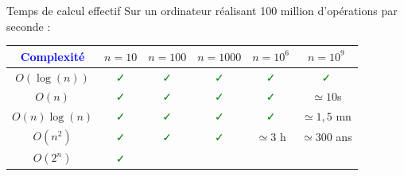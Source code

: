 \documentclass[10pt]{beamer}
\begin{document}
\begin{frame}[fragile]{\Ctitle}{\stitle}
	\begin{block}{Temps de calcul effectif}
		Sur un ordinateur réalisant 100 million d'opérations par seconde :
		\renewcommand{\arraystretch}{1.3}
		\begin{tabular}{|c|c|c|c|c|c|}
			\hline
			\textcolor{blue}{Complexité} & $n=10$                      & $n=100$                     & $n=1000$                    & $n=10^6$                    & $n=10^9$                      \\
			\hline
			$O(\log(n))$   & \textcolor{green}{\faCheck} & \textcolor{green}{\faCheck} & \textcolor{green}{\faCheck} & \textcolor{green}{\faCheck} & \textcolor{green}{\faCheck} \\
			\hline
			$O(n)$   & \textcolor{green}{\faCheck} & \textcolor{green}{\faCheck} & \textcolor{green}{\faCheck} & \textcolor{green}{\faCheck} & $\simeq 10$s \\
			\hline
			$O(n)\log(n)$   & \textcolor{green}{\faCheck} & \textcolor{green}{\faCheck} & \textcolor{green}{\faCheck} & \textcolor{green}{\faCheck} & $\simeq 1,5$ mn \\
			\hline
			$O(n^2)$   & \textcolor{green}{\faCheck} & \textcolor{green}{\faCheck} & \textcolor{green}{\faCheck} & $\simeq 3$ h & $\simeq 300$ ans \\
			\hline
			$O(2^n)$   & \textcolor{green}{\faCheck} &  \textcolor{red}{\faTimes} &  \textcolor{red}{\faTimes} &  \textcolor{red}{\faTimes} &  \textcolor{red}{\faTimes} \\
			\hline
		\end{tabular}
	\end{block}
\end{frame}
\end{document}
